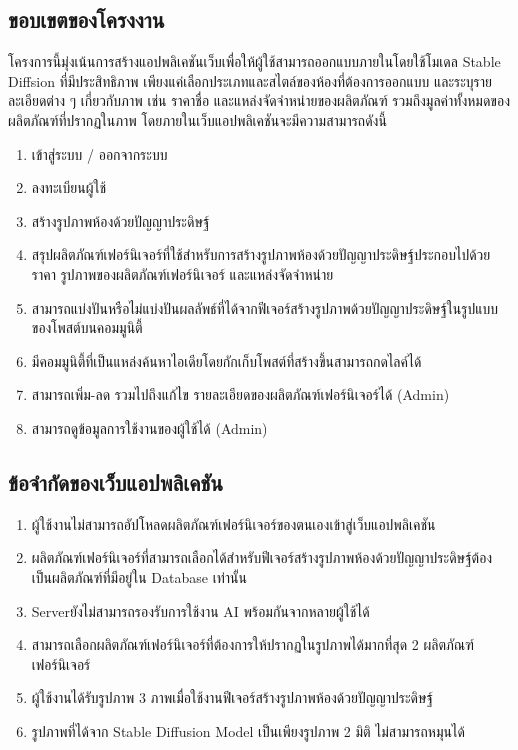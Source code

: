 \documentclass[12pt,oneside,openright,a4paper]{cpe-thai-project}
\begin{document}
\subsection{ขอบเขตของโครงงาน}
\hspace {18pt} โครงการนี้มุ่งเน้นการสร้างแอปพลิเคชันเว็บเพื่อให้ผู้ใช้สามารถออกแบบภายในโดยใช้โมเดล Stable Diffsion ที่มีประสิทธิภาพ เพียงแค่เลือกประเภทและสไตล์ของห้องที่ต้องการออกแบบ และระบุรายละเอียดต่าง ๆ เกี่ยวกับภาพ เช่น ราคาชื่อ และแหล่งจัดจำหน่ายของผลิตภัณฑ์ รวมถึงมูลค่าทั้งหมดของผลิตภัณฑ์ที่ปรากฏในภาพ โดยภายในเว็บแอปพลิเคชันจะมีความสามารถดังนี้
\begin{enumerate}
  \item เข้าสู่ระบบ / ออกจากระบบ
  \item ลงทะเบียนผู้ใช้
  \item สร้างรูปภาพห้องด้วยปัญญาประดิษฐ์
  \item สรุปผลิตภัณฑ์เฟอร์นิเจอร์ที่ใช้สำหรับการสร้างรูปภาพห้องด้วยปัญญาประดิษฐ์ประกอบไปด้วย ราคา รูปภาพของผลิตภัณฑ์เฟอร์นิเจอร์ และแหล่งจัดจำหน่าย
  \item สามารถแบ่งปันหรือไม่แบ่งปันผลลัพธ์ที่ได้จากฟีเจอร์สร้างรูปภาพด้วยปัญญาประดิษฐ์ในรูปแบบของโพสต์บนคอมมูนิตี้
  \item มีคอมมูนิตี้ที่เป็นแหล่งค้นหาไอเดียโดยกักเก็บโพสต์ที่สร้างขึ้นสามารถกดไลค์ได้
  \item สามารถเพิ่ม-ลด รวมไปถึงแก้ไข รายละเอียดของผลิตภัณฑ์เฟอร์นิเจอร์ได้ (Admin)
  \item สามารถดูข้อมูลการใช้งานของผู้ใช้ได้ (Admin)
\end{enumerate}

\subsection{ข้อจำกัดของเว็บแอปพลิเคชัน }
\begin{enumerate}
  \item ผู้ใช้งานไม่สามารถอัปโหลดผลิตภัณฑ์เฟอร์นิเจอร์ของตนเองเข้าสู่เว็บแอปพลิเคชัน
  \item ผลิตภัณฑ์เฟอร์นิเจอร์ที่สามารถเลือกได้สำหรับฟีเจอร์สร้างรูปภาพห้องด้วยปัญญาประดิษฐ์ต้องเป็นผลิตภัณฑ์ที่มีอยู่ใน Database เท่านั้น
  \item	Serverยังไม่สามารถรองรับการใช้งาน AI พร้อมกันจากหลายผู้ใช้ได้
  \item	สามารถเลือกผลิตภัณฑ์เฟอร์นิเจอร์ที่ต้องการให้ปรากฏในรูปภาพได้มากที่สุด 2 ผลิตภัณฑ์เฟอร์นิเจอร์
  \item	ผู้ใช้งานได้รับรูปภาพ 3 ภาพเมื่อใช้งานฟีเจอร์สร้างรูปภาพห้องด้วยปัญญาประดิษฐ์
  \item รูปภาพที่ได้จาก Stable Diffusion Model เป็นเพียงรูปภาพ 2 มิติ ไม่สามารถหมุนได้
\end{enumerate}
\end{document}
